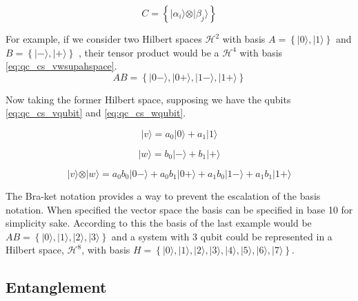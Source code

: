 \begin{equation} 
\label{eq:qc_cs_vwspace} 
C =\left\{  \vert \alpha_{i} \rangle \otimes \vert \beta_{j} \rangle \right\}
\end{equation}

For example, if we consider two Hilbert spaces $\mathcal{H}^2$ with basis
$ A=\left\{ \vert 0 \rangle , \vert 1 \rangle \right\}$ and 
$B =\left\{ \vert - \rangle, \vert + \rangle \right\}$
, their tensor product would be a $\mathcal{H}^4$ with basis \ref{eq:qc_cs_vwsupahspace}.
\begin{equation}
\label{eq:qc_cs_vwsupahspace}
AB = \left\{ \vert 0  - \rangle, \vert 0 + \rangle, \vert 1 - \rangle,  \vert 1 + \rangle \right\}
\end{equation}

Now taking the former Hilbert space, supposing we have the qubits \ref{eq:qc_cs_vqubit} and \ref{eq:qc_cs_wqubit}.

\begin{equation}
\label{eq:qc_cs_vqubit}
\vert v \rangle = a_{0}\vert 0\rangle + a_{1}\vert 1 \rangle
\end{equation}

\begin{equation}
\label{eq:qc_cs_wqubit}
\vert w \rangle = b_{0}\vert -\rangle + b_{1}\vert + \rangle
\end{equation}

\begin{equation}
\label{eq:qc_cs_vwsupahspace2}
\vert v \rangle \otimes \vert w \rangle = a_{0}b_{0}\vert 0  - \rangle + a_{0}b_{1}\vert 0 + \rangle + a_{1}b_{0}\vert 1 - \rangle +  a_{1}b_{1}\vert 1 + \rangle 
\end{equation}

The Bra-ket notation provides a way to prevent the escalation of the basis notation. When specified the vector space the basis can be specified in base 10 for simplicity sake. According to this the basis of the last example would be $AB = \left\{ \vert 0 \rangle, \vert 1 \rangle, \vert 2 \rangle,  \vert 3 \rangle \right\}$ and a system with $3$ qubit could be represented in a Hilbert space, $\mathcal{H}^{8}$, with basis $H= \left\{ \vert 0 \rangle, \vert 1 \rangle, \vert 2 \rangle,  \vert 3 \rangle,  \vert 4 \rangle,  \vert 5 \rangle,  \vert 6 \rangle,  \vert 7 \rangle \right\}$.



\subsection{Entanglement}
\label{subsec:entanglement}

